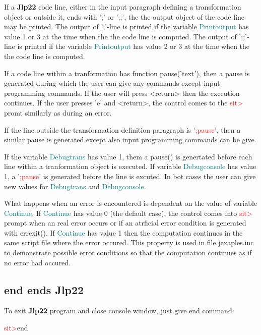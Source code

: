 If a \textbf{Jlp22} code line, either in the input paragraph defining a transformation object
or outside it, ends with ';' or ';;', the the output object of the code line may be printed.
The output of ';'-line is printed if the variable \textcolor{teal}{Printoutput} has value 1 or 3 at the time when the the
code line is computed.
The output of ';;'-line is printed if the variable \textcolor{teal}{Printoutput} has value 2 or 3 at the time when the the
code line is computed.

If a code line within a tranformation has function \textcolor{VioletRed}{pause}('text'), then a pause is generated during which
the user can give any commands except
input programming commands. If the user will press <return> then the exceution continues. If the user
presses 'e' and <return>, the control comes to the \textcolor{Red}{sit>} promt similarly as during an error.

If the line outside the transformation definition paragraph is '\textcolor{Red}{;pause}', then
a similar pause is generated except also input programming commands can be give.

If the variable \textcolor{teal}{Debugtrans} has value 1, them a \textcolor{VioletRed}{pause}() is genertated before each line within
a tranformation object is executed.  If variable \textcolor{teal}{Debugconsole} has value 1,
a '\textcolor{Red}{;pause}' is generated before  the line is excuted. In bot cases the user can
give new values for \textcolor{teal}{Debugtrans} and \textcolor{teal}{Debugconsole}.

What happens when an error is encountered is dependent on the value of variable \textcolor{teal}{Continue}. If \textcolor{teal}{Continue} has
value 0 (the default case), the control comes into \textcolor{Red}{sit>} prompt when an real error occurs or if an atrficial
error condition is generated with \textcolor{VioletRed}{errexit}(). If \textcolor{teal}{Continue} has value 1 then the computation continues in
the same script file where the error occured. This property is used in file jexaples.inc to demonstrate
possible error conditions so that the computation continues as if no error had occured.


\subsection{end ends \textbf{Jlp22}}
\label{exit}
To exit \textbf{Jlp22} program and close console window, just give end command:

\textcolor{Red}{sit>}end
